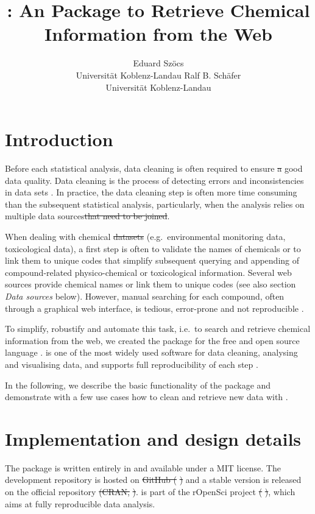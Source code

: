 \documentclass[article, shortnames]{jss}\usepackage[]{graphicx}\usepackage[]{color}
\author{Eduard Sz\"ocs\\Universit\"at Koblenz-Landau \And 
        Ralf B. Sch\"afer\\Universit\"at Koblenz-Landau}
\title{\pkg{webchem}: An \proglang{R} Package to Retrieve Chemical Information from the Web}
\providecommand{\DIFadd}[1]{{\protect\color{green}\uwave{#1}}} %
\providecommand{\DIFdel}[1]{{\protect\color{red}\sout{#1}}}                      %
\providecommand{\DIFaddbegin}{} %
\providecommand{\DIFaddend}{} %
\providecommand{\DIFdelbegin}{} %
\providecommand{\DIFdelend}{} %
\begin{document}
\section[Introduction]{Introduction}
Before each statistical analysis, data cleaning is often required to ensure \DIFdelbegin \DIFdel{a }\DIFdelend good data quality.
Data cleaning is the process of detecting errors and inconsistencies in data sets \citep{Chapman_2005}.
In practice, the data cleaning step is often more time consuming than the subsequent statistical analysis, particularly, when the analysis relies on \DIFaddbegin \DIFadd{the joining of }\DIFaddend multiple data sources\DIFdelbegin \DIFdel{that need to be joined}\DIFdelend .

When dealing with chemical \DIFdelbegin \DIFdel{datasets }\DIFdelend \DIFaddbegin \DIFadd{data sets }\DIFaddend (e.g.\ environmental monitoring data, toxicological data), a first step is often to validate the names of chemicals or to link them to unique codes that simplify subsequent querying and appending of compound-related physico-chemical or toxicological information.
Several web sources provide chemical names or link them to unique codes (see also section \emph{Data sources} below).
However, manual searching for each compound, often through a graphical web interface, is tedious, error-prone and not reproducible \citep{Peng_2009}.

To simplify, robustify and automate this task, i.e.\ to search and retrieve chemical information from the web, we created the  package for the free and open source  language \citep{r_2015, Wehrens_2011}.
 is one of the most widely used software \DIFaddbegin \DIFadd{environments }\DIFaddend for data cleaning, analysing and visualising data, and supports full reproducibility of each step \citep{Marwick_2016}.

In the following, we describe the basic functionality of the package and demonstrate with a few use cases how to clean and retrieve new data with .


\section[Implementation and design details]{Implementation and design details}
The  package is written entirely in  and available under a MIT license.
The development repository is hosted on \DIFdelbegin \DIFdel{GitHub (}%
\DIFdel{) }\DIFdelend \DIFaddbegin \DIFadd{\mbox{%
\citet{github}
}%
}\DIFaddend and a stable version is released on the official  repository \DIFdelbegin \DIFdel{(CRAN, }%
\DIFdel{)}\DIFdelend \DIFaddbegin \DIFadd{\mbox{%
\citep{cran}
}%
}\DIFaddend .
 is part of the rOpenSci project \DIFdelbegin \DIFdel{(}%
\DIFdel{)}\DIFdelend \DIFaddbegin \DIFadd{\mbox{%
\citep{boettiger2015building}
}%
}\DIFaddend , which aims at fully reproducible data analysis.
\end{document}
